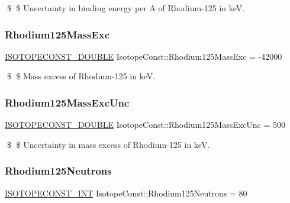 \$ \$ Uncertainty in binding energy per A of Rhodium-\/125 in keV. \mbox{\label{group___isotope_const-_rhodium-_rh125_ga99409f1461a13af96df07ce5f6a98a17}} 
\subsubsection{\texorpdfstring{Rhodium125\+Mass\+Exc}{Rhodium125MassExc}}
{\footnotesize\ttfamily \mbox{\hyperlink{group___isotope_const-_macros_ga8f45a7272ce02c0b4c65c44636ed719a}{I\+S\+O\+T\+O\+P\+E\+C\+O\+N\+S\+T\+\_\+\+D\+O\+U\+B\+LE}} Isotope\+Const\+::\+Rhodium125\+Mass\+Exc = -\/42000}

\$ \$ Mass excess of Rhodium-\/125 in keV. \mbox{\label{group___isotope_const-_rhodium-_rh125_gad1f8c3bfea7756731765c8c5fb73f6e7}} 
\subsubsection{\texorpdfstring{Rhodium125\+Mass\+Exc\+Unc}{Rhodium125MassExcUnc}}
{\footnotesize\ttfamily \mbox{\hyperlink{group___isotope_const-_macros_ga8f45a7272ce02c0b4c65c44636ed719a}{I\+S\+O\+T\+O\+P\+E\+C\+O\+N\+S\+T\+\_\+\+D\+O\+U\+B\+LE}} Isotope\+Const\+::\+Rhodium125\+Mass\+Exc\+Unc = 500}

\$ \$ Uncertainty in mass excess of Rhodium-\/125 in keV. \mbox{\label{group___isotope_const-_rhodium-_rh125_gad86bcf198ebff45956da9f6152f37538}} 
\subsubsection{\texorpdfstring{Rhodium125\+Neutrons}{Rhodium125Neutrons}}
{\footnotesize\ttfamily \mbox{\hyperlink{group___isotope_const-_macros_ga5f18360b3e99483a35c32d789e62621c}{I\+S\+O\+T\+O\+P\+E\+C\+O\+N\+S\+T\+\_\+\+I\+NT}} Isotope\+Const\+::\+Rhodium125\+Neutrons = 80}

